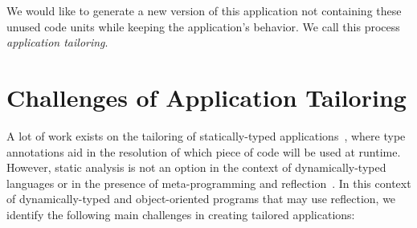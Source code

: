 We would like to generate a new version of this application not containing these unused code units while keeping the application's behavior. We call this process \emph{application tailoring}.

\section{Challenges of Application Tailoring} \label{sec:challenges}

A lot of work exists on the tailoring of statically-typed applications~\cite{Cour10a,Rays02a,Tip03a,Popa04a,Teod01a}, where type annotations aid in the resolution of which piece of code will be used at runtime. 
However, static analysis is not an option in the context of dynamically-typed languages or in the presence of meta-programming and reflection~\cite{Livs05a}.
In this context of dynamically-typed and object-oriented programs that may use reflection, we identify the following main challenges in creating tailored applications:

